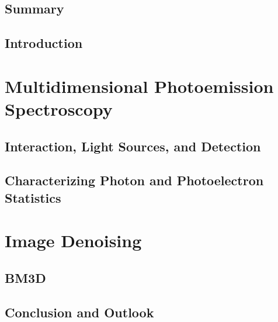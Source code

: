\documentclass[a4paper,12pt,twoside,openany]{book}
\begin{document}


\chapter*{Summary}

\tableofcontents

\printglossary[style=tree, type=\acronymtype, title=List of Acronyms]

\printglossary
\glsunsetall
\glsresetall

% 

\chapter{Introduction}


\part{Multidimensional Photoemission Spectroscopy}
\chapter{Interaction, Light Sources, and Detection}



\chapter{Characterizing Photon and Photoelectron Statistics}


\part{Image Denoising}
\chapter{BM3D}


\chapter{Conclusion and Outlook}

\end{document}
